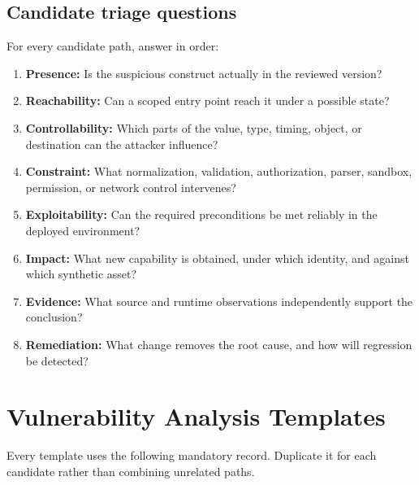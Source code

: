 \documentclass[11pt]{article}
\begin{document}
\subsection{Candidate triage questions}
For every candidate path, answer in order:
\begin{enumerate}
  \item \textbf{Presence:} Is the suspicious construct actually in the reviewed version?
  \item \textbf{Reachability:} Can a scoped entry point reach it under a possible state?
  \item \textbf{Controllability:} Which parts of the value, type, timing, object, or destination can the attacker influence?
  \item \textbf{Constraint:} What normalization, validation, authorization, parser, sandbox, permission, or network control intervenes?
  \item \textbf{Exploitability:} Can the required preconditions be met reliably in the deployed environment?
  \item \textbf{Impact:} What new capability is obtained, under which identity, and against which synthetic asset?
  \item \textbf{Evidence:} What source and runtime observations independently support the conclusion?
  \item \textbf{Remediation:} What change removes the root cause, and how will regression be detected?
\end{enumerate}

\section{Vulnerability Analysis Templates}

Every template uses the following mandatory record. Duplicate it for each
candidate rather than combining unrelated paths.
\end{document}

